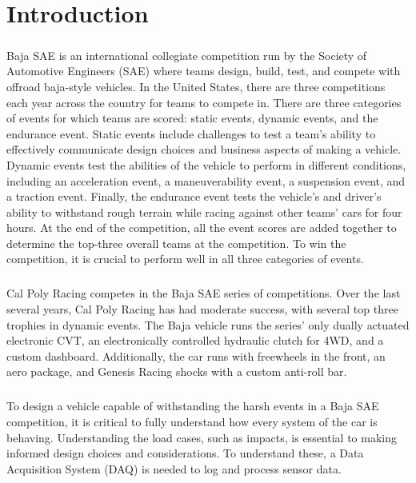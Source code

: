 \chapter{Introduction}

\paragraph{}
Baja SAE is an international collegiate competition run by the Society of Automotive Engineers (SAE) \cite{SAE} where teams design, build, test, and compete with offroad baja-style vehicles.
In the United States, there are three competitions each year across the country for teams to compete in. 
There are three categories of events for which teams are scored: static events, dynamic events, and the endurance event.  
Static events include challenges to test a team's ability to effectively communicate design choices and business aspects of making a vehicle.  
Dynamic events test the abilities of the vehicle to perform in different conditions, including an acceleration event, a maneuverability event, a suspension event, and a traction event.  
Finally, the endurance event tests the vehicle's and driver's ability to withstand rough terrain while racing against other teams' cars for four hours.
At the end of the competition, all the event scores are added together to determine the top-three overall teams at the competition.
To win the competition, it is crucial to perform well in all three categories of events.

\paragraph{}
Cal Poly Racing \cite{CalPolyRacing} competes in the Baja SAE series of competitions.
Over the last several years, Cal Poly Racing has had moderate success, with several top three trophies in dynamic events.
The Baja vehicle runs the series' only dually actuated electronic CVT, an electronically controlled hydraulic clutch for 4WD, and a custom dashboard.
Additionally, the car runs with freewheels in the front, an aero package, and Genesis Racing shocks with a custom anti-roll bar.

\paragraph{}
To design a vehicle capable of withstanding the harsh events in a Baja SAE competition, it is critical to fully understand how every system of the car is behaving.
Understanding the load cases, such as impacts, is essential to making informed design choices and considerations.
To understand these, a Data Acquisition System (DAQ) is needed to log and process sensor data.


